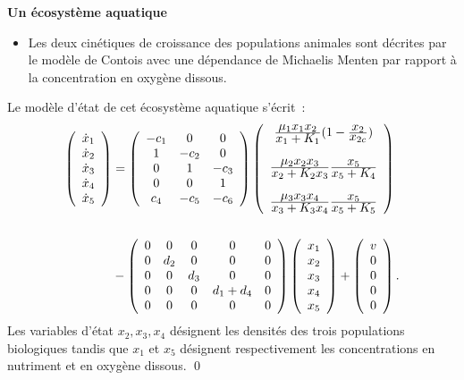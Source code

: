 \begin{exemple} {\bf Un écosystème aquatique}
\begin{itemize}
Michaelis Menten par rapport à la concentration en nutriment. 
\item Les deux
cinétiques de croissance des populations animales sont décrites par le
modèle de Contois avec une dépendance de Michaelis Menten par rapport
à la concentration en oxygène dissous. 
\end{itemize} 
Le modèle d'état de
cet écosystème aquatique s'écrit~: 
\begin{equation*} \begin{split}
\bma{c}  \dot x_1 \\ \dot x_2 \\
\dot x_3 \\ \dot x_4 \\ \dot x_5 \ema &= \bma{ccc} -c_1 & 0 & 0\\ 1 & -c_2
& 0 \\ 0 & 1 & -c_3 \\ 0 & 0 & 1 \\ c_4 & -c_5 & -c_6 \ema \bma{c}
\frac{{\textstyle \mu_1 x_1 x_2}}{{\textstyle x_1 + K_1}}(1 -
\frac{{\textstyle x_2}}{{\textstyle x_{2c}}}) \\ 
\\
\frac{{\textstyle \mu_2 x_2 x_3}}{{\textstyle x_2 + K_2x_3}}  \frac{{\textstyle
x_5}}{{\textstyle x_5 +K_4}} \\
\\
\frac{{\textstyle \mu_3 x_3 x_4}}{{\textstyle x_3 + K_3x_4}} \frac{{\textstyle
x_5}}{{\textstyle x_5 +K_5}}
\ema 
\\ & \\&- \bma{ccccc} 0 & 0 & 0 &
0 & 0 \\ 0 & d_2 & 0 & 0 & 0 \\0 & 0 & d_3 & 0 & 0  \\0 & 0 & 0 & d_1 + d_4 & 0
\\0 & 0 & 0 & 0 & 0
\ema \bma{c} x_1 \\  x_2 \\  x_3 \\  x_4 \\ x_5 \ema + \bma{c} v \\ 0  \\ 0 \\
0 \\ 0 \ema.    
\end{split} \end{equation*}
Les variables d'état
$x_2,x_3,x_4$ désignent les densités des trois populations biologiques
tandis que $x_1$ et $x_5$ désignent respectivement les concentrations en
nutriment et en oxygène dissous. \qed
\end{exemple}
 
